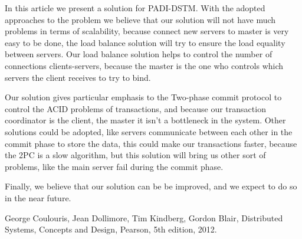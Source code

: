 \documentclass[times, 10pt,twocolumn]{article}
\begin{document}

In this article we present a solution for PADI-DSTM. With the adopted approaches to the problem we believe that our solution will not have much problems in terms of scalability, because connect new servers to master is very easy to be done, the load balance solution will try to ensure the load equality between servers. Our load balance solution helps to control the number of connections clients-servers, because the master is the one who controls which servers the client receives to try to bind.

Our solution gives particular emphasis to the Two-phase commit protocol to control the ACID problems of transactions, and because our transaction coordinator is the client, the master it isn't a bottleneck in the system. Other solutions could be adopted, like servers communicate between each other in the commit phase to store the data, this could make our transactions faster, because the 2PC is a slow algorithm, but this solution will bring us other sort of problems, like the main server fail during the commit phase.

Finally, we believe that our solution can be be improved, and we expect to do so in the near future.





\begin{thebibliography}{9}
 
George Coulouris, Jean Dollimore, Tim Kindberg, Gordon Blair,
   Distributed Systems, Concepts and Design, 
   Pearson,
   5th edition,
   2012.

\end{thebibliography}
\end{document}
